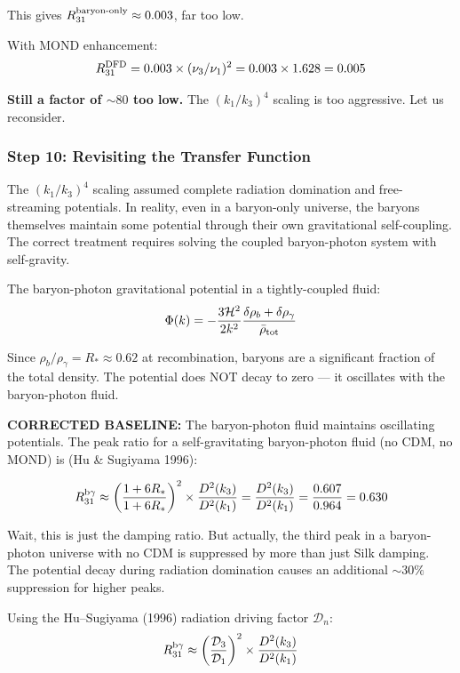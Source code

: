\documentclass[11pt,a4paper]{article}
\begin{document}
This gives $R_{31}^{\rm baryon\text{-}only} \approx 0.003$, far too low.

With MOND enhancement:
\begin{equation}
R_{31}^{\rm DFD} = 0.003 \times (\nu_3/\nu_1)^2 = 0.003 \times 1.628 = 0.005
\end{equation}

\textbf{Still a factor of $\sim 80$ too low.} The $(k_1/k_3)^4$ scaling is too aggressive. Let us reconsider.

\subsubsection{Step 10: Revisiting the Transfer Function}

The $(k_1/k_3)^4$ scaling assumed complete radiation domination and free-streaming potentials. In reality, even in a baryon-only universe, the baryons themselves maintain some potential through their own gravitational self-coupling. The correct treatment requires solving the coupled baryon-photon system with self-gravity.

The baryon-photon gravitational potential in a tightly-coupled fluid:
\begin{equation}
\Phi(k) = -\frac{3\mathcal{H}^2}{2k^2}\frac{\delta\rho_b + \delta\rho_\gamma}{\bar{\rho}_{\rm tot}}
\end{equation}

Since $\rho_b/\rho_\gamma = R_* \approx 0.62$ at recombination, baryons are a significant fraction of the total density. The potential does NOT decay to zero --- it oscillates with the baryon-photon fluid.

\textbf{CORRECTED BASELINE:} The baryon-photon fluid maintains oscillating potentials. The peak ratio for a self-gravitating baryon-photon fluid (no CDM, no MOND) is (Hu \& Sugiyama 1996):

\begin{equation}
R_{31}^{\rm b\gamma} \approx \left(\frac{1 + 6R_*}{1 + 6R_*}\right)^2 \times \frac{D^2(k_3)}{D^2(k_1)} = \frac{D^2(k_3)}{D^2(k_1)} = \frac{0.607}{0.964} = 0.630
\end{equation}

Wait, this is just the damping ratio. But actually, the third peak in a baryon-photon universe with no CDM is suppressed by more than just Silk damping. The potential decay during radiation domination causes an additional $\sim 30\%$ suppression for higher peaks.

Using the Hu--Sugiyama (1996) radiation driving factor $\mathcal{D}_n$:
\begin{equation}
R_{31}^{\rm b\gamma} \approx \left(\frac{\mathcal{D}_3}{\mathcal{D}_1}\right)^2 \times \frac{D^2(k_3)}{D^2(k_1)}
\end{equation}
\end{document}
